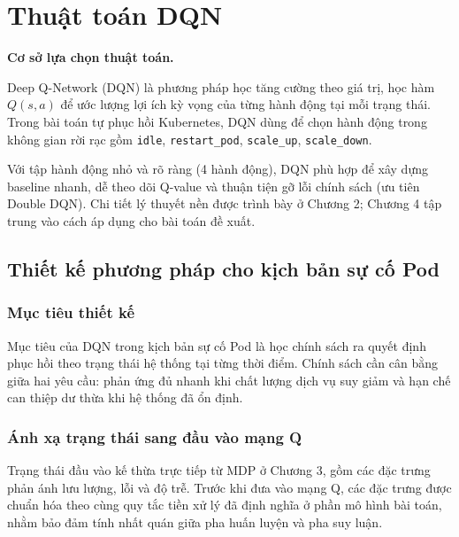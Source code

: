 \section{Thuật toán DQN}

\noindent\textbf{Cơ sở lựa chọn thuật toán.}

\noindent Deep Q-Network (DQN) là phương pháp học tăng cường theo giá trị, học hàm $Q(s, a)$ để ước lượng lợi ích kỳ vọng của từng hành động tại mỗi trạng thái. Trong bài toán tự phục hồi Kubernetes, DQN dùng để chọn hành động trong không gian rời rạc gồm \texttt{idle}, \texttt{restart\_pod}, \texttt{scale\_up}, \texttt{scale\_down}.

\noindent Với tập hành động nhỏ và rõ ràng (4 hành động), DQN phù hợp để xây dựng baseline nhanh, dễ theo dõi Q-value và thuận tiện gỡ lỗi chính sách (ưu tiên Double DQN). Chi tiết lý thuyết nền được trình bày ở Chương 2; Chương 4 tập trung vào cách áp dụng cho bài toán đề xuất.

\subsection{Thiết kế phương pháp cho kịch bản sự cố Pod}

\subsubsection{Mục tiêu thiết kế}

\noindent Mục tiêu của DQN trong kịch bản sự cố Pod là học chính sách ra quyết định phục hồi theo trạng thái hệ thống tại từng thời điểm. Chính sách cần cân bằng giữa hai yêu cầu: phản ứng đủ nhanh khi chất lượng dịch vụ suy giảm và hạn chế can thiệp dư thừa khi hệ thống đã ổn định.

\subsubsection{Ánh xạ trạng thái sang đầu vào mạng Q}

\noindent Trạng thái đầu vào kế thừa trực tiếp từ MDP ở Chương 3, gồm các đặc trưng phản ánh lưu lượng, lỗi và độ trễ. Trước khi đưa vào mạng Q, các đặc trưng được chuẩn hóa theo cùng quy tắc tiền xử lý đã định nghĩa ở phần mô hình bài toán, nhằm bảo đảm tính nhất quán giữa pha huấn luyện và pha suy luận.


